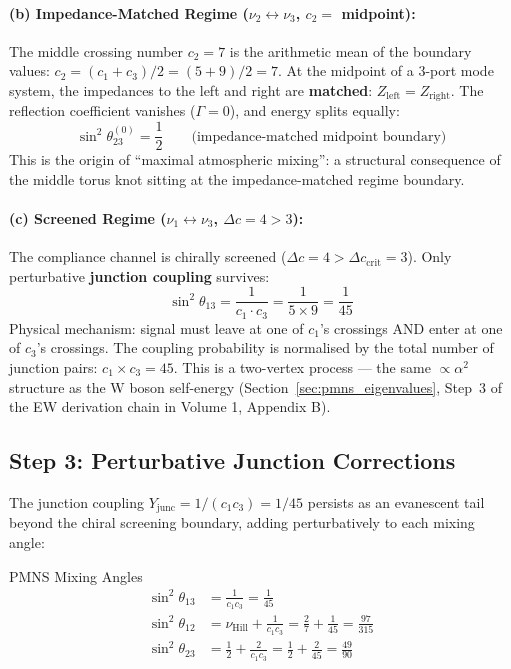 \paragraph{(b) Impedance-Matched Regime ($\nu_2 \leftrightarrow \nu_3$, $c_2 = $ midpoint):}
The middle crossing number $c_2 = 7$ is the arithmetic mean of the boundary values: $c_2 = (c_1 + c_3)/2 = (5 + 9)/2 = 7$. At the midpoint of a 3-port mode system, the impedances to the left and right are \textbf{matched}: $Z_{\text{left}} = Z_{\text{right}}$. The reflection coefficient vanishes ($\Gamma = 0$), and energy splits equally:
\begin{equation}
    \sin^2\theta_{23}^{(0)} = \frac{1}{2} \qquad \text{(impedance-matched midpoint boundary)}
    \label{eq:theta23_leading}
\end{equation}
This is the origin of ``maximal atmospheric mixing'': a structural consequence of the middle torus knot sitting at the impedance-matched regime boundary.

\paragraph{(c) Screened Regime ($\nu_1 \leftrightarrow \nu_3$, $\Delta c = 4 > 3$):}
The compliance channel is chirally screened ($\Delta c = 4 > \Delta c_{\text{crit}} = 3$). Only perturbative \textbf{junction coupling} survives:
\begin{equation}
    \sin^2\theta_{13} = \frac{1}{c_1 \cdot c_3} = \frac{1}{5 \times 9} = \frac{1}{45}
    \label{eq:theta13}
\end{equation}
Physical mechanism: signal must leave at one of $c_1$'s crossings AND enter at one of $c_3$'s crossings. The coupling probability is normalised by the total number of junction pairs: $c_1 \times c_3 = 45$. This is a two-vertex process --- the same $\propto \alpha^2$ structure as the W boson self-energy (Section~\ref{sec:pmns_eigenvalues}, Step~3 of the EW derivation chain in Volume 1, Appendix B).

\subsection{Step 3: Perturbative Junction Corrections}
\label{sec:pmns_junction}

The junction coupling $Y_{\text{junc}} = 1/(c_1 c_3) = 1/45$ persists as an evanescent tail beyond the chiral screening boundary, adding perturbatively to each mixing angle:
\begin{resultbox}{PMNS Mixing Angles}
\begin{align}
    \sin^2\theta_{13} &= \frac{1}{c_1 c_3} = \frac{1}{45} \label{eq:pmns_13} \\[4pt]
    \sin^2\theta_{12} &= \nu_{\text{Hill}} + \frac{1}{c_1 c_3} = \frac{2}{7} + \frac{1}{45} = \frac{97}{315} \label{eq:pmns_12} \\[4pt]
    \sin^2\theta_{23} &= \frac{1}{2} + \frac{2}{c_1 c_3} = \frac{1}{2} + \frac{2}{45} = \frac{49}{90} \label{eq:pmns_23}
\end{align}
\end{resultbox}

